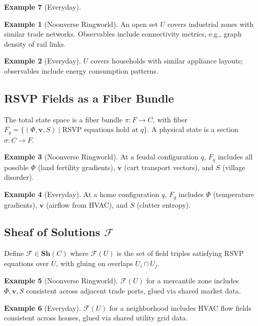 \documentclass[11pt]{article}
\theoremstyle{plain}
\theoremstyle{definition}
\newtheorem{example}{Example}[section]
\begin{document}
\begin{example}[Everyday]
\begin{example}[Noonverse Ringworld]
An open set $U$ covers industrial zones with similar trade networks. Observables include connectivity metrics, e.g., graph density of rail links.
\end{example}

\begin{example}[Everyday]
$U$ covers households with similar appliance layouts; observables include energy consumption patterns.
\end{example}

\subsection{RSVP Fields as a Fiber Bundle}
The total state space is a fiber bundle $\pi: F \to C$, with fiber $F_q = \{( \Phi, \mathbf{v}, S ) \mid \text{RSVP equations hold at } q\}$. A physical state is a section $\sigma: C \to F$.

\begin{example}[Noonverse Ringworld]
At a feudal configuration $q$, $F_q$ includes all possible $\Phi$ (land fertility gradients), $\mathbf{v}$ (cart transport vectors), and $S$ (village disorder).
\end{example}

\begin{example}[Everyday]
At a home configuration $q$, $F_q$ includes $\Phi$ (temperature gradients), $\mathbf{v}$ (airflow from HVAC), and $S$ (clutter entropy).
\end{example}

\subsection{Sheaf of Solutions $\mathscr{F}$}
Define $\mathscr{F} \in \mathbf{Sh}(C)$ where $\mathscr{F}(U)$ is the set of field triples satisfying RSVP equations over $U$, with gluing on overlaps $U_i \cap U_j$.

\begin{example}[Noonverse Ringworld]
$\mathscr{F}(U)$ for a mercantile zone includes $\Phi, \mathbf{v}, S$ consistent across adjacent trade ports, glued via shared market data.
\end{example}

\begin{example}[Everyday]
$\mathscr{F}(U)$ for a neighborhood includes HVAC flow fields consistent across houses, glued via shared utility grid data.
\end{example}


\end{example}
\end{document}
